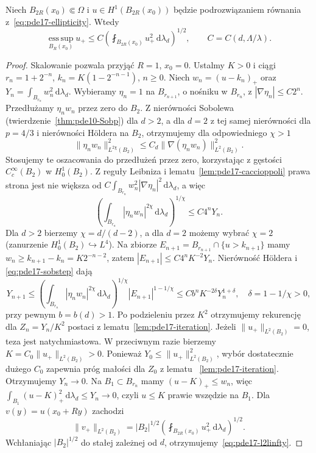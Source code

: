 \begin{twierdzenie}
\label{thm:pde17-l2linfty}
Niech $B_{2R}(x_0)\Subset\Omega$ i $u\in H^1(B_{2R}(x_0))$
będzie podrozwiązaniem równania z~\eqref{eq:pde17-ellipticity}.
Wtedy
\begin{equation}\label{eq:pde17-l2linfty}
 \operatorname*{ess\,sup}_{B_R(x_0)}u_+
 \le C\left(\fint_{B_{2R}(x_0)}u_+^2\,\mathrm d\lambda_d\right)^{1/2},
 \qquad C=C(d,\Lambda/\lambda).
\end{equation}
\end{twierdzenie}
\begin{proof}
Skalowanie pozwala przyjąć $R=1$, $x_0=0$. Ustalmy
$K>0$ i ciągi
$r_n=1+2^{-n}$, $k_n=K(1-2^{-n-1})$, $n\ge0$.
Niech $w_n=(u-k_n)_+$ oraz
$Y_n=\int_{B_{r_n}}w_n^2\,\mathrm d\lambda_d$.
Wybieramy $\eta_n=1$ na $B_{r_{n+1}}$, o nośniku w $B_{r_n}$,
z $|\nabla\eta_n|\le C2^n$.
Przedłużamy $\eta_n w_n$ przez zero do $B_2$.
Z nierówności Sobolewa (twierdzenie~\ref{thm:pde10-Sobp})
dla $d>2$, a dla $d=2$ z tej samej nierówności dla $p=4/3$
i nierówności Höldera na $B_2$, otrzymujemy dla odpowiedniego
$\chi>1$
\[
 \|\eta_n w_n\|_{L^{2\chi}(B_2)}^2
 \le C_d\|\nabla(\eta_n w_n)\|_{L^2(B_2)}^2.
\]
Stosujemy te oszacowania do przedłużeń przez zero, korzystając
z gęstości $C_c^\infty(B_2)$ w $H_0^1(B_2)$.
Z reguły Leibniza i lematu~\ref{lem:pde17-caccioppoli}
prawa strona jest nie większa od
$C\int_{B_{r_n}}w_n^2|\nabla\eta_n|^2\,\mathrm d\lambda_d$,
a więc
\begin{equation}\label{eq:pde17-sobstep}
 \left(\int_{B_{r_n}}|\eta_nw_n|^{2\chi}\,\mathrm d\lambda_d
 \right)^{1/\chi}\le C4^nY_n.
\end{equation}
Dla $d>2$ bierzemy $\chi=d/(d-2)$, a dla $d=2$
możemy wybrać $\chi=2$ (zanurzenie $H_0^1(B_2)\hookrightarrow L^4$).
Na zbiorze $E_{n+1}=B_{r_{n+1}}\cap\{u>k_{n+1}\}$ mamy
$w_n\ge k_{n+1}-k_n=K2^{-n-2}$, zatem
$|E_{n+1}|\le C4^nK^{-2}Y_n$. Nierówność Höldera i
\eqref{eq:pde17-sobstep} dają
\[
 Y_{n+1}\le
 \left(\int_{B_{r_n}}|\eta_nw_n|^{2\chi}\,\mathrm d\lambda_d\right)^{1/\chi}
 |E_{n+1}|^{1-1/\chi}
 \le Cb^nK^{-2\delta}Y_n^{1+\delta},
 \quad\delta=1-1/\chi>0,
\]
przy pewnym $b=b(d)>1$. Po podzieleniu przez $K^2$
otrzymujemy rekurencję dla $Z_n=Y_n/K^2$ postaci
z lematu~\ref{lem:pde17-iteration}. Jeżeli $\|u_+\|_{L^2(B_2)}=0$, teza jest natychmiastowa.
W przeciwnym razie bierzemy
$K=C_0\|u_+\|_{L^2(B_2)}>0$.
Ponieważ $Y_0\le\|u_+\|_{L^2(B_2)}^2$, wybór dostatecznie
dużego $C_0$ zapewnia próg małości dla $Z_0$ z lematu
~\ref{lem:pde17-iteration}. Otrzymujemy $Y_n\to0$.
Na $B_1\subset B_{r_n}$ mamy $(u-K)_+\le w_n$, więc
$\int_{B_1}(u-K)_+^2\,\mathrm d\lambda_d\le Y_n\to0$,
czyli $u\le K$ prawie wszędzie na $B_1$.
Dla $v(y)=u(x_0+Ry)$ zachodzi
\[
 \|v_+\|_{L^2(B_2)}
 =|B_2|^{1/2}
 \left(\fint_{B_{2R}(x_0)}u_+^2\,\mathrm d\lambda_d\right)^{1/2}.
\]
Wchłaniając $|B_2|^{1/2}$ do stałej zależnej od $d$,
otrzymujemy~\eqref{eq:pde17-l2linfty}.
\end{proof}

